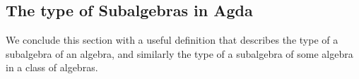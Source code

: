 \documentclass[a4paper,USenglish,cleveref,autoref,thm-restate]{lipics-v2019}
\begin{document}
\subsection{The type of Subalgebras in Agda}\label{sec:the-type-of-subalgebras-in-agda}
We conclude this section with a useful definition that describes the type of a subalgebra of an algebra, and similarly the type of a subalgebra of some algebra in a class of algebras.
\begin{code}\end{code}

\end{document}
